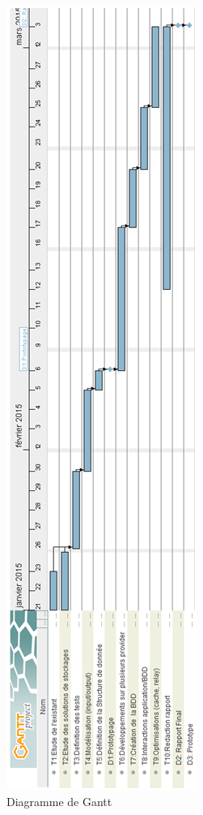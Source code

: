\documentclass[10pt]{article}
\begin{document}
\begin{figure}[h] \centering
\includegraphics[scale=0.65]{Gantt.png}
\caption{Diagramme de Gantt} \end{figure}


\end{document}

